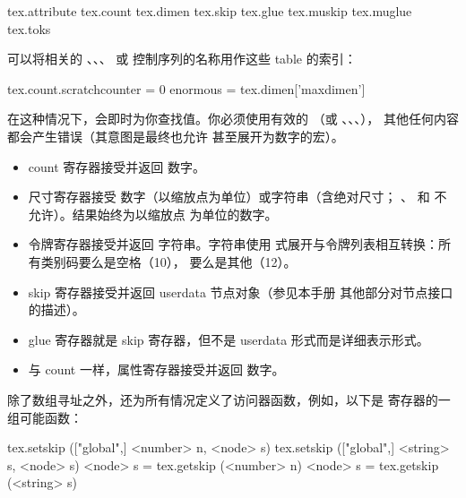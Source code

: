 \startthreecolumns
\begin{typing}
tex.attribute
tex.count
tex.dimen
tex.skip
tex.glue
tex.muskip
tex.muglue
tex.toks
\end{typing}
\stopthreecolumns

可以将相关的 、、、
 或  控制序列的名称用作这些 table 的索引：

\begin{typing}
tex.count.scratchcounter = 0
enormous = tex.dimen['maxdimen']
\end{typing}

在这种情况下，\LUATEX 会即时为你查找值。你必须使用有效的 
（或 、、、），
其他任何内容都会产生错误（其意图是最终也允许 
甚至展开为数字的宏）。

\begin{itemize}\item count 寄存器接受并返回 \LUA 数字。
    

    \item 尺寸寄存器接受 \LUA 数字（以缩放点为单位）或字符串（含绝对尺寸；
        、 和  不允许）。结果始终为以缩放点
        为单位的数字。
    

    \item 令牌寄存器接受并返回 \LUA 字符串。\LUA 字符串使用 
         式展开与令牌列表相互转换：所有类别码要么是空格（10），
        要么是其他（12）。
    

    \item skip 寄存器接受并返回  userdata 节点对象（参见本手册
        其他部分对节点接口的描述）。
    

    \item glue 寄存器就是 skip 寄存器，但不是 userdata 形式而是详细表示形式。
    

    \item 与 count 一样，属性寄存器接受并返回 \LUA 数字。
    

\end{itemize}

除了数组寻址之外，还为所有情况定义了访问器函数，例如，以下是 
寄存器的一组可能函数：

\begin{typing}
tex.setskip (["global",] <number> n, <node> s)
tex.setskip (["global",] <string> s, <node> s)
<node> s = tex.getskip (<number> n)
<node> s = tex.getskip (<string> s)
\end{typing}

